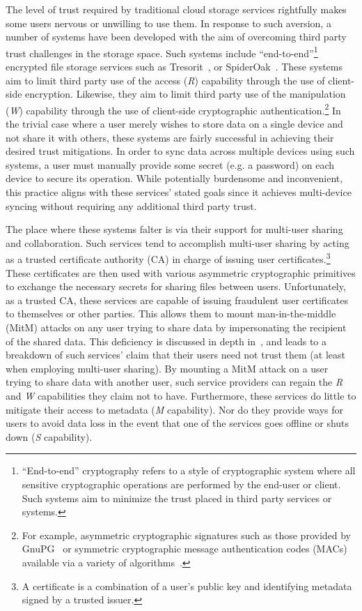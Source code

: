 The level of trust required by traditional cloud storage services
rightfully makes some users nervous or unwilling to use them. In
response to such aversion, a number of systems have been developed
with the aim of overcoming third party trust challenges in the storage
space. Such systems include ``end-to-end''\footnote{``End-to-end''
  cryptography refers to a style of cryptographic system where all
  sensitive cryptographic operations are performed by the end-user or
  client. Such systems aim to minimize the trust placed in third party
  services or systems.} encrypted file storage services such as
Tresorit~\cite{tresorit}, or SpiderOak~\cite{spideroak}. These systems
aim to limit third party use of the access (\emph{R}) capability
through the use of client-side encryption. Likewise, they aim to limit
third party use of the manipulation (\emph{W}) capability through the
use of client-side cryptographic authentication.\footnote{For example,
  asymmetric cryptographic signatures such as those provided by
  GnuPG~\cite{gnupg} or symmetric cryptographic message authentication
  codes (MACs) available via a variety of
  algorithms~\cite{dworkin2005, dworkin2008, dworkin2007}.}  In the
trivial case where a user merely wishes to store data on a single
device and not share it with others, these systems are fairly
successful in achieving their desired trust mitigations. In order to
sync data across multiple devices using such systems, a user must
manually provide some secret (e.g. a password) on each device to
secure its operation. While potentially burdensome and inconvenient,
this practice aligns with these services' stated goals since it
achieves multi-device syncing without requiring any additional third
party trust.

The place where these systems falter is via their support for
multi-user sharing and collaboration. Such services tend to accomplish
multi-user sharing by acting as a trusted certificate authority (CA)
in charge of issuing user certificates.\footnote{A certificate is a
  combination of a user's public key and identifying metadata signed
  by a trusted issuer.}  These certificates are then used with various
asymmetric cryptographic primitives to exchange the necessary secrets
for sharing files between users. Unfortunately, as a trusted CA, these
services are capable of issuing fraudulent user certificates to
themselves or other parties. This allows them to mount
man-in-the-middle (MitM) attacks on any user trying to share data by
impersonating the recipient of the shared data. This deficiency is
discussed in depth in~\cite{wilson2014}, and leads to a breakdown of
such services' claim that their users need not trust them (at least
when employing multi-user sharing). By mounting a MitM attack on a
user trying to share data with another user, such service providers
can regain the \emph{R} and \emph{W} capabilities they claim not to
have. Furthermore, these services do little to mitigate their access
to metadata (\emph{M} capability). Nor do they provide ways for users
to avoid data loss in the event that one of the services goes offline
or shuts down (\emph{S} capability).

